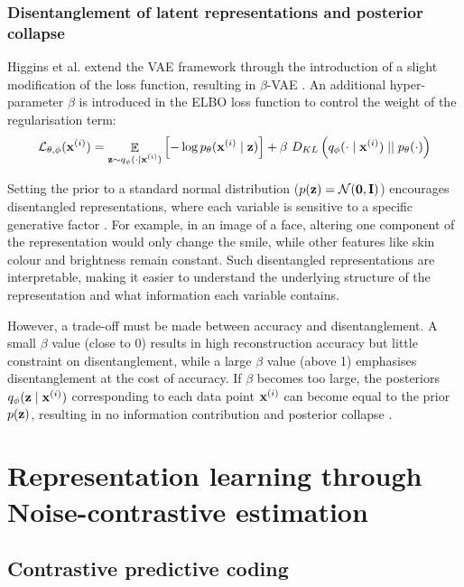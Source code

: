 \subsubsection{Disentanglement of latent representations and posterior collapse} \label{cha:disentang}
	Higgins et al. extend the VAE framework through the introduction of a slight modification of the loss function, resulting in $\beta$-VAE \cite{higginsBetaVAELearningBasic2022}. An additional hyper-parameter $\beta$ is introduced in the ELBO loss function to control the weight of the regularisation term:
	$$
	\mathcal{L}_{\theta, \phi} (\mathbf{x}^{(i)}) = \mathop{\mathbb{E}}_{\substack{\mathbf{z} \sim q_\phi (\cdot \mid \mathbf{x}^{(i)})}} \left[ -\log p_\theta (\mathbf{x}^{(i)} \mid \mathbf{z}) \right] + \beta~ D_{KL} \left(  q_\phi (\cdot \mid \mathbf{x}^{(i)})  \mid \mid  p_\theta(\cdot)  \right)
	$$
	
	Setting the prior to a standard normal distribution ($p(\mathbf{z}) = \mathcal{N}(\bm{\mathbf{0}}, \mathbf{I})$) encourages disentangled representations, where each variable is sensitive to a specific generative factor \cite{higginsBetaVAELearningBasic2022, bengioRepresentationLearningReview2013a}. For example, in an image of a face, altering one component of the representation would only change the smile, while other features like skin colour and brightness remain constant. Such disentangled representations are interpretable, making it easier to understand the underlying structure of the representation and what information each variable contains.
	
	However, a trade-off must be made between accuracy and disentanglement. A small $\beta$ value (close to 0) results in high reconstruction accuracy but little constraint on disentanglement, while a large $\beta$ value (above 1) emphasises disentanglement at the cost of accuracy. If $\beta$ becomes too large, the posteriors $q_\phi (\mathbf{z} \mid \mathbf{x}^{(i)})$ corresponding to each data point $\mathbf{x}^{(i)}$ can become equal to the prior $p(\mathbf{z})$, resulting in no information contribution and posterior collapse \cite{lucasUnderstandingPosteriorCollapse2022}.
	

	



\section{Representation learning through Noise-contrastive estimation}




\subsection{Contrastive predictive coding}


